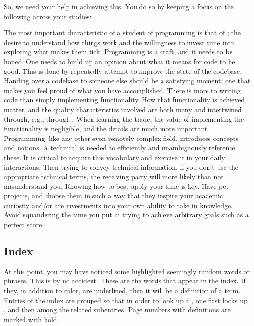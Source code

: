 So, we need your help in achieving this. You do so by keeping a focus on the following across your studies:
\begin{enumerate}
   The most important characteristic of a student of programming is that of ; the desire to understand how things work and the willingness to invest time into exploring what makes them tick.
   Programming is a craft, and it needs to be honed. One needs to build up an opinion about what it means for code to be good. This is done by repeatedly attempt to improve the state of the codebase. Handing over a codebase to someone else should be a satisfying moment; one that makes you feel proud of what you have accomplished.
   There is more to writing code than simply implementing functionality. How that functionality is achieved matter, and the quality characteristics involved are both many and intertwined through, e.g., through . When learning the trade, the value of implementing the functionality is negligible, and the details are much more important.
   Programming, like any other even remotely complex field, introduces concepts and notions. A technical  is needed to efficiently and unambiguously reference these. It is critical to acquire this vocabulary and exercise it in your daily interactions. Then trying to convey technical information, if you don't use the appropriate technical terms, the receiving party will more likely than not misunderstand you.
   Knowing how to best apply your time is key. Have pet projects, and choose them in such a way that they inspire your academic curiosity and/or are investments into your own ability to take in knowledge. Avoid squandering the time you put in trying to achieve arbitrary goals such as a perfect score.
\end{enumerate}

\begin{inspiration}{\cite{Feynman1974}}
\end{inspiration}

\subsection{Index}

At this point, you may have noticed some highlighted seemingly random words or phrases. This is by no accident. These are the words that appear in the index. If they, in addition to color, are underlined, then it will be a definition of a term. Entries of the index are grouped so that in order to look up a , one first looks up , and then  among the related subentries. Page numbers with definitions are marked with bold.

